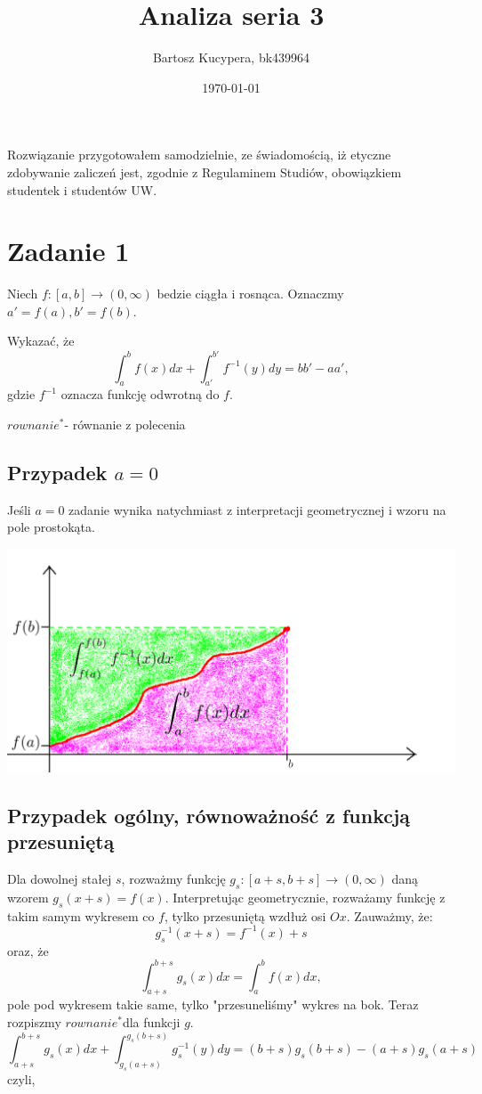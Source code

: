 \documentclass{article}
\title{Analiza seria 3}
\author{Bartosz Kucypera, bk439964}
\date{\today}
\def\rw{$rownanie^*$}
\begin{document}
\maketitle

Rozwiązanie przygotowałem samodzielnie, ze świadomością, iż etyczne zdobywanie zaliczeń jest, zgodnie z Regulaminem Studiów, obowiązkiem studentek i studentów UW.

\section*{Zadanie 1}
Niech $f:[a,b] \to (0,\infty)$ bedzie ciągła i rosnąca. Oznaczmy $a'=f(a),b'=f(b)$.

Wykazać, że 
$$\int_a^bf(x)dx+\int_{a'}^{b'}f^{-1}(y)dy=bb' - aa',$$
gdzie $f^{-1}$ oznacza funkcję odwrotną do $f$.

\rw - równanie z polecenia

\subsection*{Przypadek $a=0$}
Jeśli $a=0$ zadanie wynika natychmiast z interpretacji geometrycznej i wzoru na pole prostokąta.

\includegraphics[scale=0.4]{jd.png}

\newpage


\subsection*{Przypadek ogólny, równoważność z funkcją przesuniętą}
Dla dowolnej stałej $s$, rozważmy funkcję $g_s:[a+s,b+s] \to (0, \infty)$ daną wzorem $g_s(x+s) = f(x)$. \newline
Interpretując geometrycznie, rozważamy funkcję z takim samym wykresem co $f$, tylko przesuniętą wzdłuż osi $Ox$. \newline 
Zauważmy, że:
$$g_s^{-1}(x+s) = f^{-1}(x) + s$$
oraz, że
$$\int_{a+s}^{b+s}g_s(x)dx = \int_a^bf(x)dx,$$
pole pod wykresem takie same, tylko "przesuneliśmy" wykres na bok. \newline
\newline
Teraz rozpiszmy \rw dla funkcji $g$.
$$\int_{a+s}^{b+s}g_s(x)dx + \int_{g_s(a+s)}^{g_s(b+s)}g_s^{-1}(y)dy = (b+s)g_s(b+s)-(a+s)g_s(a+s)$$
czyli,
\end{document}
